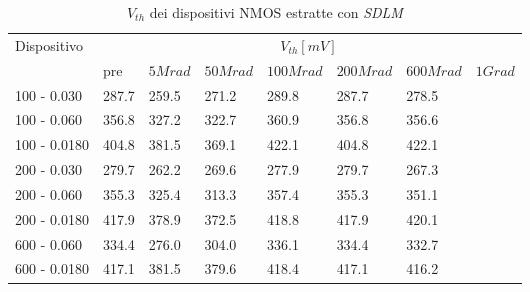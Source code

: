 \documentclass[12pt, letterpaper]{book}
\begin{document}
\begin{table}[H]
  \renewcommand{\arraystretch}{1.3}
  \begin{tabular}{m{2.1cm} m{0.8cm} m{1.1cm} m{1.3cm} m{1.5cm} m{1.5cm} m{1.5cm} m{1cm}}
    \toprule
    \multirow{2}{*}{Dispositivo} & \multicolumn{7}{c}{$V_{th} [mV] $}                                                                    \\
    \cmidrule{2-8}
                                 & pre                                & $5Mrad$ & $50Mrad$ & $100Mrad$ & $200Mrad$ & $600Mrad$ & $1Grad$ \\
    \midrule
    100 - 0.030                     & 287.7                              & 259.5   & 271.2    & 289.8     & 287.7     & 278.5     &         \\
    \hline
    100 - 0.060                     & 356.8                              & 327.2   & 322.7    & 360.9     & 356.8     & 356.6     &         \\
    \hline
    100 - 0.0180                    & 404.8                              & 381.5   & 369.1    & 422.1     & 404.8     & 422.1     &         \\
    \hline
    200 - 0.030                     & 279.7                              & 262.2   & 269.6    & 277.9     & 279.7     & 267.3     &         \\
    \hline
    200 - 0.060                     & 355.3                              & 325.4   & 313.3    & 357.4     & 355.3     & 351.1     &         \\
    \hline
    200 - 0.0180                    & 417.9                              & 378.9   & 372.5    & 418.8     & 417.9     & 420.1     &         \\
    \hline
    600 - 0.060                     & 334.4                              & 276.0   & 304.0    & 336.1     & 334.4     & 332.7     &         \\
    \hline
    600 - 0.0180                    & 417.1                              & 381.5   & 379.6    & 418.4     & 417.1     & 416.2     &         \\
    \bottomrule
  \end{tabular}
  \caption{$V_{th}$ dei dispositivi NMOS estratte con \emph{SDLM}}
  \label{tab:VthSDLMN}
\end{table}
\end{document}
